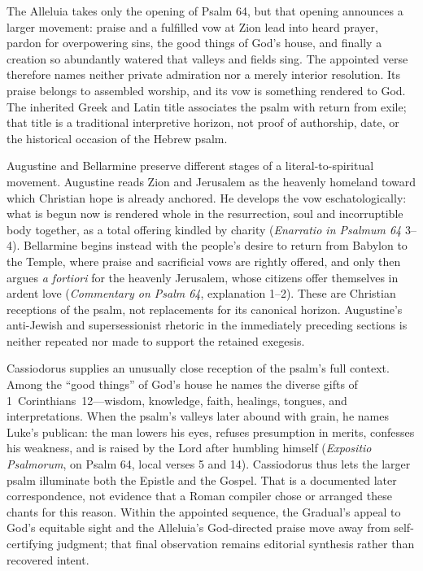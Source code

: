 The Alleluia takes only the opening of Psalm 64, but that opening announces a
larger movement: praise and a fulfilled vow at Zion lead into heard prayer,
pardon for overpowering sins, the good things of God's house, and finally a
creation so abundantly watered that valleys and fields sing. The appointed
verse therefore names neither private admiration nor a merely interior
resolution. Its praise belongs to assembled worship, and its vow is something
rendered to God. The inherited Greek and Latin title associates the psalm with
return from exile; that title is a traditional interpretive horizon, not proof
of authorship, date, or the historical occasion of the Hebrew psalm.

Augustine and Bellarmine preserve different stages of a literal-to-spiritual
movement. Augustine reads Zion and Jerusalem as the heavenly homeland toward
which Christian hope is already anchored. He develops the vow
eschatologically: what is begun now is rendered whole in the resurrection,
soul and incorruptible body together, as a total offering kindled by charity
(\emph{Enarratio in Psalmum 64} 3--4). Bellarmine begins instead with the
people's desire to return from Babylon to the Temple, where praise and
sacrificial vows are rightly offered, and only then argues \emph{a fortiori}
for the heavenly Jerusalem, whose citizens offer themselves in ardent love
(\emph{Commentary on Psalm 64}, explanation 1--2). These are Christian
receptions of the psalm, not replacements for its canonical horizon.
Augustine's anti-Jewish and supersessionist rhetoric in the immediately
preceding sections is neither repeated nor made to support the retained
exegesis.

Cassiodorus supplies an unusually close reception of the psalm's full context.
Among the ``good things'' of God's house he names the diverse gifts of
1~Corinthians~12---wisdom, knowledge, faith, healings, tongues, and
interpretations. When the psalm's valleys later abound with grain, he names
Luke's publican: the man lowers his eyes, refuses presumption in merits,
confesses his weakness, and is raised by the Lord after humbling himself
(\emph{Expositio Psalmorum}, on Psalm 64, local verses 5 and 14). Cassiodorus
thus lets the larger psalm illuminate both the Epistle and the Gospel. That is
a documented later correspondence, not evidence that a Roman compiler chose
or arranged these chants for this reason. Within the appointed sequence, the
Gradual's appeal to God's equitable sight and the Alleluia's God-directed
praise move away from self-certifying judgment; that final observation remains
editorial synthesis rather than recovered intent.
